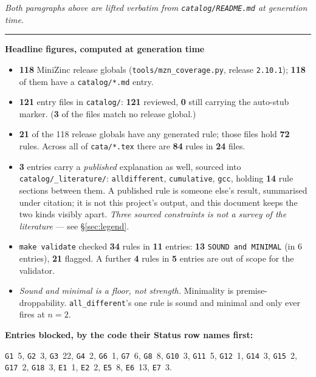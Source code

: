 \documentclass[10pt,a4paper]{article}
\begin{document}
\begin{titlepage}
\emph{Both paragraphs above are lifted verbatim from \texttt{catalog/README.md} at generation time.}
\vspace{1.0em}
\hrule
\vspace{1.2em}
{\large\bfseries Headline figures, computed at generation time\par}
\begin{itemize}\setlength{\itemsep}{0pt}
\item \textbf{118} MiniZinc release globals (\texttt{tools/mzn\_coverage.py}, release \texttt{2.10.1}); \textbf{118} of them have a \texttt{catalog/*.md} entry.
\item \textbf{121} entry files in \texttt{catalog/}: \textbf{121} reviewed, \textbf{0} still carrying the auto-stub marker. (\textbf{3} of the files match no release global.)
\item \textbf{21} of the 118 release globals have any generated rule; those files hold \textbf{72} rules. Across all of \texttt{cata/*.tex} there are \textbf{84} rules in \textbf{24} files.
\item \textbf{3} entries carry a \emph{published} explanation as well, sourced into \texttt{catalog/\_literature/}: \texttt{alldifferent}, \texttt{cumulative}, \texttt{gcc}, holding \textbf{14} rule sections between them. A published rule is someone else's result, summarised under citation; it is not this project's output, and this document keeps the two kinds visibly apart. \emph{Three sourced constraints is not a survey of the literature} --- see \S\ref{sec:legend}.
\item \texttt{make validate} checked \textbf{34} rules in \textbf{11} entries: \textbf{13} \texttt{SOUND and MINIMAL} (in 6 entries), \textbf{21} flagged. A further \textbf{4} rules in \textbf{5} entries are out of scope for the validator.
\item \emph{Sound and minimal is a floor, not strength.} Minimality is premise-droppability. \texttt{all\_different}'s one rule is sound and minimal and only ever fires at $n=2$.
\end{itemize}
\vspace{0.6em}
{\bfseries Entries blocked, by the code their Status row names first:}\par
\texttt{G1}~5, \texttt{G2}~3, \texttt{G3}~22, \texttt{G4}~2, \texttt{G6}~1, \texttt{G7}~6, \texttt{G8}~8, \texttt{G10}~3, \texttt{G11}~5, \texttt{G12}~1, \texttt{G14}~3, \texttt{G15}~2, \texttt{G17}~2, \texttt{G18}~3, \texttt{E1}~1, \texttt{E2}~2, \texttt{E5}~8, \texttt{E6}~13, \texttt{E7}~3.
\end{titlepage}
\tableofcontents
\clearpage
\end{document}
